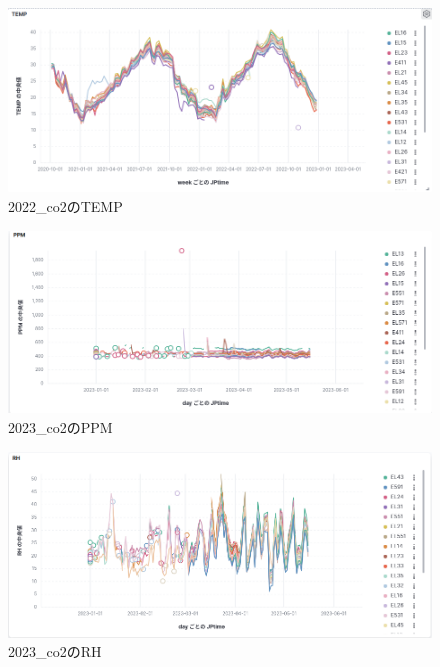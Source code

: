 \begin{figure}[!ht]
    \begin{center}
        \includegraphics[width=160mm]{sotu/figure/2022_temp.png}
        \caption{2022\_co2のTEMP}
        \label{p3}
    \end{center}
\end{figure}

\begin{figure}[!ht]
    \begin{center}
        \includegraphics[width=160mm]{sotu/figure/2023_ppm.png}
        \caption{2023\_co2のPPM}
        \label{p4}
    \end{center}
\end{figure}

\begin{figure}[!ht]
    \begin{center}
        \includegraphics[width=160mm]{sotu/figure/2023_rh.png}
        \caption{2023\_co2のRH}
        \label{p5}
    \end{center}
\end{figure}

